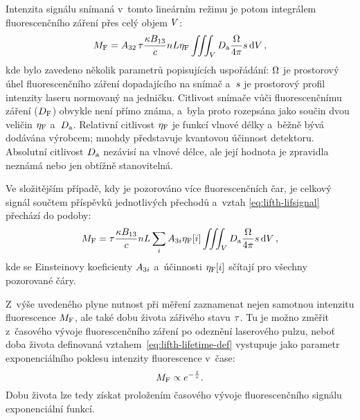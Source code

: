 Intenzita signálu snímaná v~tomto lineárním režimu je potom
integrálem fluorescenčního záření přes celý objem $V$:
\begin{equation}
	\label{eq:lifth-lifsignal}
	M_\text{F} = A_{32}\,\tau
	\frac{\kappa B_{13}}{c}
	n L \eta_\text{F}
	\iiint_V D_\text{a} \frac{\Omega}{4\pi} s \dd{V},
\end{equation}
kde bylo zavedeno několik parametrů popisujících uspořádání:
$\Omega$ je prostorový úhel fluorescenčního záření dopadajícího
na snímač
a~$s$ je prostorový profil intenzity laseru normovaný na jedničku.
Citlivost snímače vůči fluorescenčnímu záření ($D_\text{F}$) obvykle není přímo
známa,
a~byla proto rozepsána jako součin dvou veličin $\eta_\text{F}$ a~$D_\text{a}$.
Relativní citlivost $\eta_\text{F}$ je funkcí vlnové délky a~běžně bývá dodávána
výrobcem; mnohdy představuje kvantovou účinnost detektoru.
Absolutní citlivost $D_\text{a}$ nezávisí na vlnové délce,
ale její hodnota je zpravidla neznámá nebo jen obtížně stanovitelná.

Ve složitějším případě, kdy je pozorováno více fluorescenčních čar,
je celkový signál součtem příspěvků jednotlivých přechodů
a~vztah \eqref{eq:lifth-lifsignal} přechází do podoby:
\begin{equation}
	\label{eq:lifth-lifsignal-multi}
	M_\text{F} = \tau
	\frac{\kappa B_{13}}{c}
	n L \sum_i A_{3i} \eta_\text{F}[i]
	\iiint_V D_\text{a} \frac{\Omega}{4\pi} s \dd{V},
\end{equation}
kde se Einsteinovy koeficienty $A_{3i}$ a~účinnosti $\eta_\text{F}[i]$
sčítají pro všechny pozorované čáry.

Z~výše uvedeného plyne nutnost při měření zaznamenat nejen samotnou
intenzitu fluorescence $M_\text{F}$,
ale také dobu života zářivého stavu $\tau$.
Tu je možno změřit z~časového vývoje fluorescenčního záření po odeznění
laserového pulzu,
neboť doba života definovaná vztahem~\eqref{eq:lifth-lifetime-def} vystupuje
jako parametr exponenciálního poklesu intenzity fluorescence v~čase:
\begin{equation}
	M_\text{F} \propto e^{-\frac{t}{\tau}}.
\end{equation}
Dobu života lze tedy získat proložením časového vývoje fluorescenčního
signálu exponenciální funkcí.

